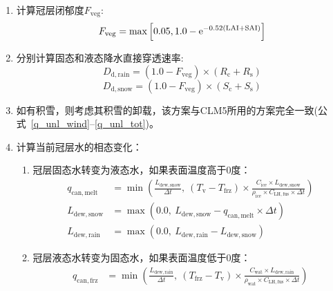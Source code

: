 \begin{enumerate}
  \item 计算冠层闭郁度$F_{\mathrm{veg}}$:
    \begin{equation}
      F_{\mathrm{veg}} = \max\left[0.05,1.0-{\mathrm e}^{-0.52\left({\rm LAI}+{\rm SAI}\right)}\right]
    \end{equation}
  \item 分别计算固态和液态降水直接穿透速率:
    \begin{equation}
      D_{\mathrm{d,rain}}=\left(1.0-F_{\mathrm{veg}}\right) \times (R_{\mathrm{c}}+R_{\mathrm{s}})
    \end{equation}
    \begin{equation}
      D_{\mathrm{d,snow}}=\left(1.0-F_{\mathrm{veg}}\right) \times (S_{\mathrm{c}}+S_{\mathrm{s}})
    \end{equation}
  \item 如有积雪，则考虑其积雪的卸载，该方案与CLM5所用的方案完全一致(公式~\eqref{q_unl_wind}--\eqref{q_unl_tot})。
  \item 计算当前冠层水的相态变化：
    \begin{enumerate}
      \item 冠层固态水转变为液态水，如果表面温度高于0度：
        \begin{equation}
          \begin{aligned}
            q_{\mathrm{can, melt}} &=\min \left(\frac{L_{\mathrm{dew,snow}}}{\Delta t},\ \left(T_{\mathrm{v}}-T_{\mathrm{frz}}\right) \times \frac{C_{\mathrm{ice}} \times L_{\mathrm{dew,snow}}}{\rho_{\mathrm{i c e}} \times C_{\mathrm{LH, fus}} \times \Delta t}\right) \\
            L_{\mathrm{dew,snow}} &=\max \left(0.0,\ L_{\mathrm{dew,snow}}-q_{\mathrm{c a n, m e l t}} \times \Delta t\right) \\
            L_{\mathrm{dew,rain}} &=\max \left(0.0,\ L_{\mathrm{dew,rain}}-L_{\mathrm{dew,snow}}\right)
          \end{aligned}
        \end{equation}
      \item 冠层液态水转变为固态水，如果表面温度低于0度：
        \begin{equation}
          \begin{aligned}
            q_{\mathrm{c a n, f r z}} &=\min \left(\frac{L_{\mathrm{dew,rain}}}{\Delta t},\ \left(T_{\mathrm{f r z}}-T_{\mathrm{v}}\right) \times \frac{C_{\mathrm{wat}} \times L_{\mathrm{dew,rain}}}{\rho_{\mathrm{wat}} \times C_{\mathrm{LH, fus}} \times \Delta t}\right) \\

\end{aligned}
\end{equation}
\end{enumerate}
\end{enumerate}
